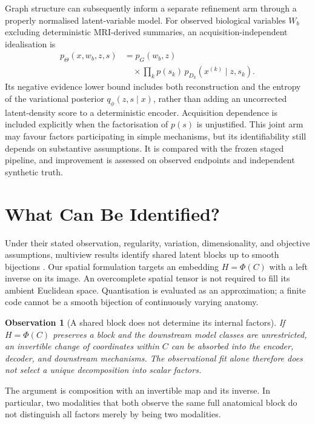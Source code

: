 \documentclass[10pt,twocolumn,letterpaper]{article}
\newtheorem{observation}{Observation}
\begin{document}
Graph structure can subsequently inform a separate refinement arm through a properly normalised latent-variable model. For observed biological variables $W_b$ excluding deterministic MRI-derived summaries, an acquisition-independent idealisation is
\begin{equation}
 \begin{aligned}
 p_\Theta(x,w_b,z,s)&=p_G(w_b,z)\\
 &\quad\times\prod_k p(s_k)\,p_{D_k}(x^{(k)}\mid z,s_k).
 \end{aligned}
\end{equation}
Its negative evidence lower bound includes both reconstruction and the entropy of the variational posterior $q_\phi(z,s\mid x)$, rather than adding an uncorrected latent-density score to a deterministic encoder. Acquisition dependence is included explicitly when the factorisation of $p(s)$ is unjustified. This joint arm may favour factors participating in simple mechanisms, but its identifiability still depends on substantive assumptions. It is compared with the frozen staged pipeline, and improvement is assessed on observed endpoints and independent synthetic truth.

\section{What Can Be Identified?}
\label{sec:identification}

Under their stated observation, regularity, variation, dimensionality, and objective assumptions, multiview results identify shared latent blocks up to smooth bijections \cite{yao2024}. Our spatial formulation targets an embedding $H=\Phi(C)$ with a left inverse on its image. An overcomplete spatial tensor is not required to fill its ambient Euclidean space. Quantisation is evaluated as an approximation; a finite code cannot be a smooth bijection of continuously varying anatomy.

\begin{observation}[A shared block does not determine its internal factors]
If $H=\Phi(C)$ preserves a block and the downstream model classes are unrestricted, an invertible change of coordinates within $C$ can be absorbed into the encoder, decoder, and downstream mechanisms. The observational fit alone therefore does not select a unique decomposition into scalar factors.
\end{observation}
\noindent The argument is composition with an invertible map and its inverse. In particular, two modalities that both observe the same full anatomical block do not distinguish all factors merely by being two modalities.
\end{document}
